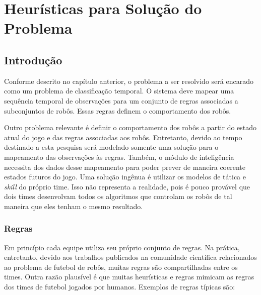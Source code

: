 \chapter{Heurísticas para Solução do Problema}\label{cap:heuristicas}

\section{Introdução}

Conforme descrito no capítulo anterior, o problema a ser resolvido será
encarado como um problema de classificação temporal. O sistema deve mapear uma
sequência temporal de observações para um conjunto de regras associadas a
subconjuntos de robôs. Essas regras definem o comportamento dos robôs.

Outro problema relevante é definir o comportamento dos robôs a partir do estado
atual do jogo e das regras associadas aos robôs. Entretanto, devido ao tempo
destinado a esta pesquisa será modelado somente uma solução para o mapeamento das
observações às regras. Também, o módulo de inteligência necessita dos dados
desse mapeamento para poder prever de maneira coerente estados futuros do jogo. Uma
solução ingênua é utilizar os modelos de tática e \textit{skill} do próprio time.
Isso não representa a realidade, pois é pouco provável que dois times desenvolvam
todos os algoritmos que controlam os robôs de tal maneira que eles tenham o mesmo
resultado.

\subsection{Regras}

Em princípio cada equipe utiliza seu próprio conjunto de regras.
Na prática, entretanto, devido aos trabalhos publicados na comunidade científica
relacionados ao problema de futebol de robôs, muitas regras são compartilhadas
entre os times. Outra razão plausível é que muitas heurísticas e regras mimicam
as regras dos times de futebol jogados por humanos. Exemplos de regras típicas são:

